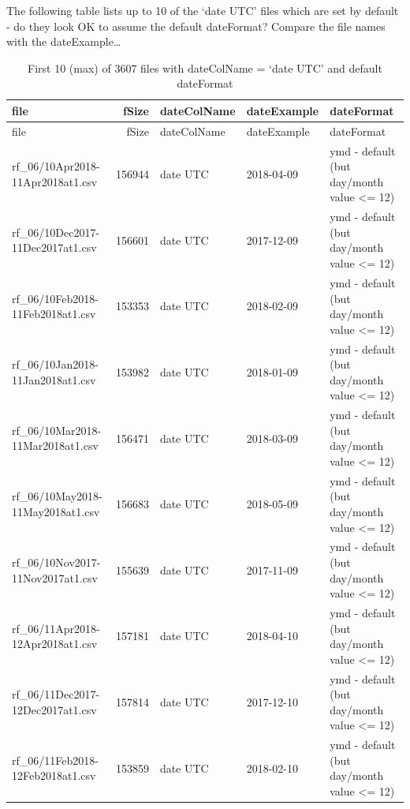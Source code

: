 \documentclass[]{article}
\newenvironment{Shaded}{\begin{snugshade}}{\end{snugshade}}
\newcommand{\KeywordTok}[1]{\textcolor[rgb]{0.13,0.29,0.53}{\textbf{#1}}}
\newcommand{\DataTypeTok}[1]{\textcolor[rgb]{0.13,0.29,0.53}{#1}}
\newcommand{\DecValTok}[1]{\textcolor[rgb]{0.00,0.00,0.81}{#1}}
\newcommand{\StringTok}[1]{\textcolor[rgb]{0.31,0.60,0.02}{#1}}
\newcommand{\CommentTok}[1]{\textcolor[rgb]{0.56,0.35,0.01}{\textit{#1}}}
\newcommand{\OperatorTok}[1]{\textcolor[rgb]{0.81,0.36,0.00}{\textbf{#1}}}
\newcommand{\NormalTok}[1]{#1}
\begin{document}
The following table lists up to 10 of the `date UTC' files which are set
by default - do they look OK to assume the default dateFormat? Compare
the file names with the dateExample\ldots{}

\begin{Shaded}
\end{Shaded}

\begin{longtable}[]{@{}lrlll@{}}
\caption{First 10 (max) of 3607 files with dateColName = `date UTC' and
default dateFormat}\tabularnewline
\toprule
file & fSize & dateColName & dateExample & dateFormat\tabularnewline
\midrule
\endfirsthead
\toprule
file & fSize & dateColName & dateExample & dateFormat\tabularnewline
\midrule
\endhead
rf\_06/10Apr2018-11Apr2018at1.csv & 156944 & date UTC & 2018-04-09 & ymd
- default (but day/month value \textless{}= 12)\tabularnewline
rf\_06/10Dec2017-11Dec2017at1.csv & 156601 & date UTC & 2017-12-09 & ymd
- default (but day/month value \textless{}= 12)\tabularnewline
rf\_06/10Feb2018-11Feb2018at1.csv & 153353 & date UTC & 2018-02-09 & ymd
- default (but day/month value \textless{}= 12)\tabularnewline
rf\_06/10Jan2018-11Jan2018at1.csv & 153982 & date UTC & 2018-01-09 & ymd
- default (but day/month value \textless{}= 12)\tabularnewline
rf\_06/10Mar2018-11Mar2018at1.csv & 156471 & date UTC & 2018-03-09 & ymd
- default (but day/month value \textless{}= 12)\tabularnewline
rf\_06/10May2018-11May2018at1.csv & 156683 & date UTC & 2018-05-09 & ymd
- default (but day/month value \textless{}= 12)\tabularnewline
rf\_06/10Nov2017-11Nov2017at1.csv & 155639 & date UTC & 2017-11-09 & ymd
- default (but day/month value \textless{}= 12)\tabularnewline
rf\_06/11Apr2018-12Apr2018at1.csv & 157181 & date UTC & 2018-04-10 & ymd
- default (but day/month value \textless{}= 12)\tabularnewline
rf\_06/11Dec2017-12Dec2017at1.csv & 157814 & date UTC & 2017-12-10 & ymd
- default (but day/month value \textless{}= 12)\tabularnewline
rf\_06/11Feb2018-12Feb2018at1.csv & 153859 & date UTC & 2018-02-10 & ymd
- default (but day/month value \textless{}= 12)\tabularnewline
\bottomrule
\end{longtable}
\end{document}
